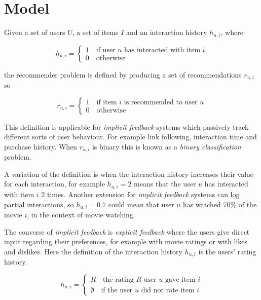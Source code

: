 
\section{Model}\label{sec:model}


Given a set of users $U$, a set of items $I$ and an interaction history $h_{u, i}$,  where

\begin{equation}\label{eq:hist}
    h_{u, i} = \begin{cases}
        1 \quad \text{if user $u$ has interacted with item $i$} \\
        0 \quad \text{otherwise}
    \end{cases}
\end{equation}

the recommender problem is defined by producing a set of recommendations $r_{u, i}$ so

\begin{equation}
    r_{u, i} = \begin{cases}
        1 \quad \text{if item $i$ is recommended to user $u$} \\
        0 \quad \text{otherwise}
    \end{cases}
\end{equation}

This definition is applicable for \textit{implicit feedback} systems which passively track different sorts of user behaviour. For example link following, interaction time and purchase history. When $r_{u, i}$ is binary this is known as a \textit{binary classification} problem.

A variation of the definition is when the interaction history increases their value for each interaction, for example $h_{u, i} = 2$ means that the user $u$ has interacted with item $i$ 2 times. Another extension for \textit{implicit feedback} systems can log partial interactions, so $h_{u, i} = 0.7$ could mean that user $u$ has watched 70\% of the movie $i$, in the context of movie watching. \citep{hu2008collaborative}

The converse of \textit{implicit feedback} is \textit{explicit feedback} where the users give direct input regarding their preferences, for example with movie ratings or with likes and dislikes.  Here the definition of the interaction history $h_{u, i}$ is the users' rating history.

\begin{equation}
    h_{u, i} = \begin{cases}
        R \quad \text{the rating $R$ user $u$ gave item $i$} \\
        \emptyset \quad \text{if the user $u$ did not rate item $i$}
    \end{cases}
\end{equation}

